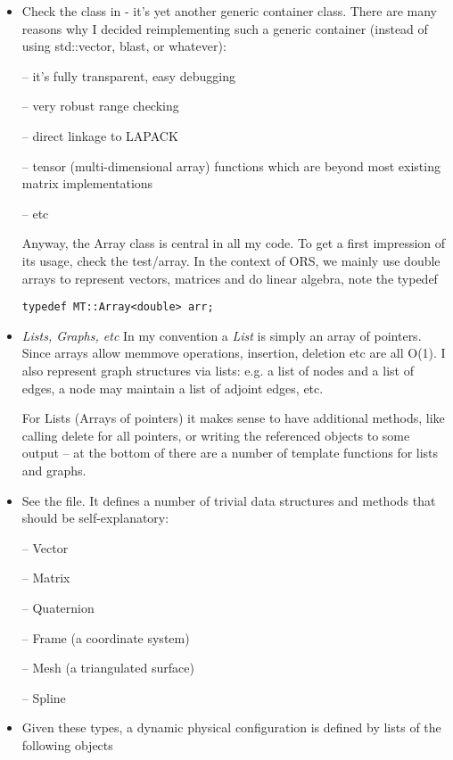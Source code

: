 \begin{itemize}
\item Check the  class in  - it's yet
 another generic container class. There are many reasons why I decided
reimplementing such a generic container (instead of using std::vector,
blast, or whatever):

-- it's fully transparent, easy debugging

-- very robust range checking

-- direct linkage to LAPACK

-- tensor (multi-dimensional array) functions which are beyond
   most existing matrix implementations

-- etc

Anyway, the Array class is central in all my code. To get a first
impression of its usage, check the test/array. In the context of ORS,
we mainly use double arrays to represent vectors, matrices and do
linear algebra, note the typedef
\begin{code}
\begin{verbatim}
typedef MT::Array<double> arr;
\end{verbatim}
\end{code}

\item \emph{Lists, Graphs, etc} In my convention a \emph{List} is
simply an array of pointers. Since arrays allow memmove operations,
insertion, deletion etc are all O(1). I also represent graph
structures via lists: e.g. a list of nodes and a list of edges, a node
may maintain a list of adjoint edges, etc.

For Lists (Arrays of pointers) it makes sense to have additional
methods, like calling delete for all pointers, or writing the
referenced objects to some output -- at the bottom of 
there are a number of template functions for lists and graphs.

\item See the  file. It defines a number of trivial data
structures and methods that should be self-explanatory:

-- Vector

-- Matrix

-- Quaternion

-- Frame (a coordinate system)

-- Mesh (a triangulated surface)

-- Spline

\item Given these types, a dynamic physical configuration is
defined by lists of the following objects


\end{itemize}
